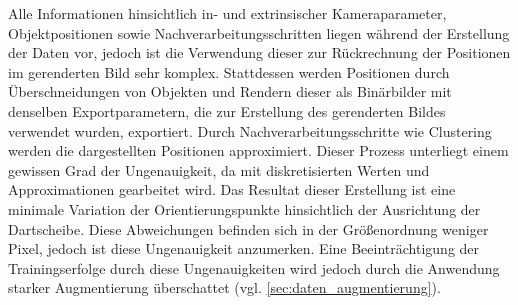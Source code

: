 Alle Informationen hinsichtlich in- und extrinsischer Kameraparameter, Objektpositionen sowie Nachverarbeitungsschritten liegen während der Erstellung der Daten vor, jedoch ist die Verwendung dieser zur Rückrechnung der Positionen im gerenderten Bild sehr komplex. Stattdessen werden Positionen durch Überschneidungen von Objekten und Rendern dieser als Binärbilder mit denselben Exportparametern, die zur Erstellung des gerenderten Bildes verwendet wurden, exportiert. Durch Nachverarbeitungsschritte wie Clustering werden die dargestellten Positionen approximiert. Dieser Prozess unterliegt einem gewissen Grad der Ungenauigkeit, da mit diskretisierten Werten und Approximationen gearbeitet wird. Das Resultat dieser Erstellung ist eine minimale Variation der Orientierungspunkte hinsichtlich der Ausrichtung der Dartscheibe. Diese Abweichungen befinden sich in der Größenordnung weniger Pixel, jedoch ist diese Ungenauigkeit anzumerken. Eine Beeinträchtigung der Trainingserfolge durch diese Ungenauigkeiten wird jedoch durch die Anwendung starker Augmentierung überschattet (vgl. \autoref{sec:daten_augmentierung}).
